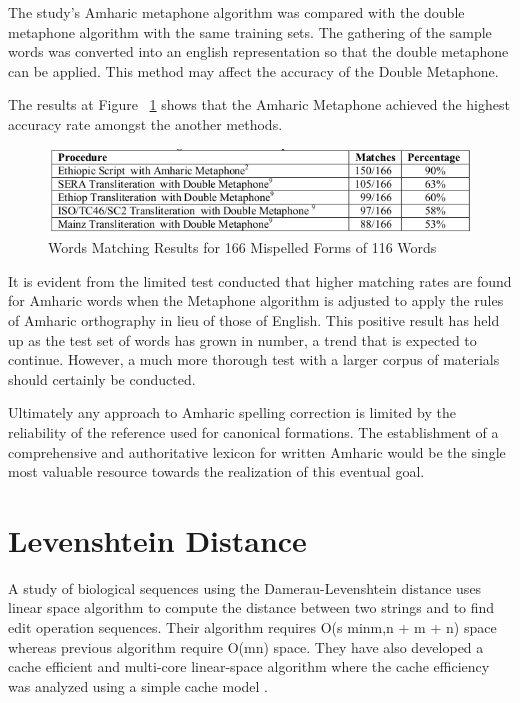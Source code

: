 \documentclass[12pt]{book}
\begin{document}
The study’s Amharic metaphone algorithm was compared with the double metaphone algorithm with the same training sets. The gathering of the sample words was converted into an english representation so that the double metaphone can be applied. This method may affect the accuracy of the Double Metaphone.

The results at Figure ~\ref{amharicresults} shows that the Amharic Metaphone achieved the highest accuracy rate amongst the another methods.

\begin{figure}
\begin{center}	
\includegraphics[scale=.65]{amharicresults.png}
	\caption[Words Matching Results for 166 Mispelled Forms of 116 Words]
	{Words Matching Results for 166 Mispelled Forms of 116 Words}	
	\label{amharicresults}
\end{center}
\end{figure}


It is evident from the limited test conducted that higher matching rates are found for Amharic words when the Metaphone algorithm is adjusted to apply the rules of Amharic orthography in lieu of those of English. This positive result has held up as the test set of words has grown in number, a trend that is expected to continue. However, a much more thorough test with a larger corpus of materials should certainly be conducted.

Ultimately any approach to Amharic spelling correction is limited by the reliability of the reference used for canonical formations. The establishment of a comprehensive and authoritative lexicon for written Amharic would be the single most valuable resource towards the realization of this eventual goal.


\section{Levenshtein Distance}
A study of biological sequences using the Damerau-Levenshtein distance uses linear space algorithm to compute the distance between two strings and to find edit operation sequences. Their algorithm requires O(s min{m,n} + m + n) space whereas previous algorithm require O(mn) space. They have also developed a cache efficient and multi-core linear-space algorithm where the cache efficiency was analyzed using a simple cache model \cite{zhao2017efficient}.
\end{document}
